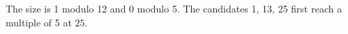 The size is 1 modulo 12 and 0 modulo 5. The candidates 1, 13, 25 first reach a multiple of 5 at $\boxed{25}$.
